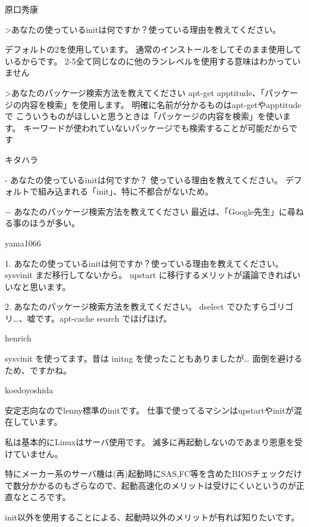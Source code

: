 

\begin{prework}{ 原口秀康 }

>あなたの使っているinitは何ですか？使っている理由を教えてください。

デフォルトの2を使用しています。
通常のインストールをしてそのまま使用しているからです。
2-5全て同じなのに他のランレベルを使用する意味はわかっていません

>あなたのパッケージ検索方法を教えてください
apt-get apptitude、「パッケージの内容を検索」を使用します。
明確に名前が分かるものはapt-getやapptitudeで
こういうものがほしいと思うときは「パッケージの内容を検索」を使います。
キーワードが使われていないパッケージでも検索することが可能だからです

\end{prework}



\begin{prework}{ キタハラ }

- あなたの使っているinitは何ですか？
使っている理由を教えてください。
デフォルトで組み込まれる「init」、特に不都合がないため。

− あなたのパッケージ検索方法を教えてください
最近は、「Google先生」に尋ねる事のほうが多い。


\end{prework}



\begin{prework}{ yama1066 }

1. あなたの使っているinitは何ですか？使っている理由を教えてください。
sysvinit
まだ移行してないから。
upstart に移行するメリットが議論できればいいなと思います。

2. あなたのパッケージ検索方法を教えてください。
dselect でひたすらゴリゴリ…、嘘です。apt-cache search でほげほげ。

\end{prework}



\begin{prework}{ henrich }

sysvinit を使ってます。昔は initng を使ったこともありましたが…
面倒を避けるため、ですかね。

\end{prework}



\begin{prework}{ koedoyoshida }

安定志向なのでlenny標準のinitです。
仕事で使ってるマシンはupstartやinitが混在しています。

私は基本的にLinuxはサーバ使用です。
滅多に再起動しないのであまり恩恵を受けていません。

特にメーカー系のサーバ機は(再)起動時にSAS,FC等を含めたBIOSチェックだけで数分かかるのもざらなので、起動高速化のメリットは受けにくいというのが正直なところです。

init以外を使用することによる、起動時以外のメリットが有れば知りたいです。


\end{prework}




